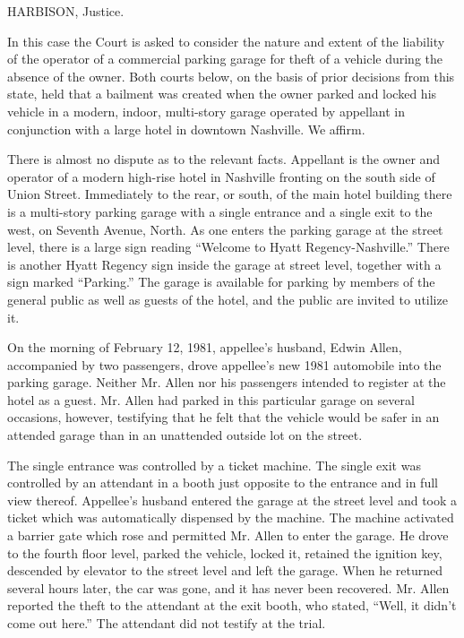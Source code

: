 
HARBISON, Justice.

In this case the Court is asked to consider the nature and extent of the
liability of the operator of a commercial parking garage for theft of a vehicle
during the absence of the owner. Both courts below, on the basis of prior
decisions from this state, held that a bailment was created when the owner
parked and locked his vehicle in a modern, indoor, multi-story garage operated
by appellant in conjunction with a large hotel in downtown Nashville. We
affirm.

There is almost no dispute as to the relevant facts. Appellant is the owner and
operator of a modern high-rise hotel in Nashville fronting on the south side of
Union Street. Immediately to the rear, or south, of the main hotel building
there is a multi-story parking garage with a single entrance and a single exit
to the west, on Seventh Avenue, North. As one enters the parking garage at the
street level, there is a large sign reading ``Welcome to Hyatt
Regency-Nashville.'' There is another Hyatt Regency sign inside the garage at
street level, together with a sign marked ``Parking.'' The garage is available
for parking by members of the general public as well as guests of the hotel,
and the public are invited to utilize it.

On the morning of February 12, 1981, appellee's husband, Edwin Allen,
accompanied by two passengers, drove appellee's new 1981 automobile into the
parking garage. Neither Mr. Allen nor his passengers intended to register at
the hotel as a guest. Mr. Allen had parked in this particular garage on several
occasions, however, testifying that he felt that the vehicle would be safer in
an attended garage than in an unattended outside lot on the street.

The single entrance was controlled by a ticket machine. The single exit was
controlled by an attendant in a booth just opposite to the entrance and in full
view thereof. Appellee's husband entered the garage at the street level and
took a ticket which was automatically dispensed by the machine. The machine
activated a barrier gate which rose and permitted Mr. Allen to enter the
garage. He drove to the fourth floor level, parked the vehicle, locked it,
retained the ignition key, descended by elevator to the street level and left
the garage. When he returned several hours later, the car was gone, and it has
never been recovered. Mr. Allen reported the theft to the attendant at the exit
booth, who stated, ``Well, it didn't come out here.'' The attendant did not
testify at the trial.

